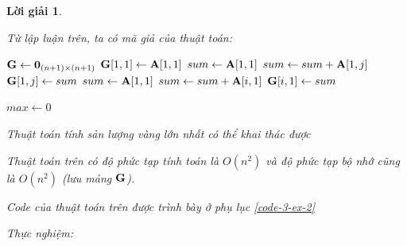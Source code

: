 \documentclass[14pt, a4paper]{article}
\theoremstyle{sltheorem}
\theoremstyle{soltheorem}
\newtheorem*{loigiai}{Lời giải}
\begin{document}
\begin{loigiai}
\begin{itemize} [label={$-$}]
        Từ lập luận trên, ta có mã giả của thuật toán:

        \begin{algorithm}[h!]
            \DontPrintSemicolon

            $\bold{G} \gets \bold{0}_{(n+1) \times (n+1)}$\;
            $\bold{G} \lbrack 1, 1 \rbrack \gets \bold{A} \lbrack 1, 1 \rbrack$\;
            $sum \gets \bold{A} \lbrack 1, 1 \rbrack$\;
             {
                $sum \gets sum + \bold{A} \lbrack 1, j \rbrack$\;
                $\bold{G} \lbrack 1, j \rbrack \gets sum$\;
            }
            $sum \gets \bold{A} \lbrack 1, 1 \rbrack$\;
             {
                $sum \gets sum + \bold{A} \lbrack i, 1 \rbrack$\;
                $\bold{G} \lbrack i, 1 \rbrack \gets sum$\;
            }

            $max \gets 0$\;
            \;
            \caption{Thuật toán tính sản lượng vàng lớn nhất có thể khai thác được}
        \end{algorithm}

        Thuật toán trên có độ phức tạp tính toán là $O(n^2)$ và độ phức tạp bộ nhớ cũng là $O(n^2)$ (lưu mảng $\bold{G}$).

        Code của thuật toán trên được trình bày ở phụ lục \ref{code-3-ex-2}

        Thực nghiệm:


\end{itemize}
\end{loigiai}
\end{document}
